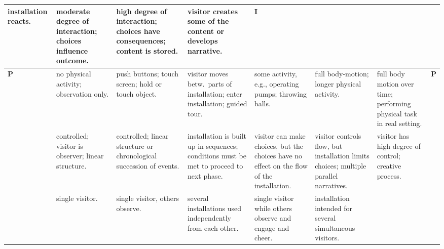 \begin{sidewaystable}
\begin{tabular}{|l|p{.13\hsize}|p{.13\hsize}|p{.13\hsize}|p{.13\hsize}|p{.13\hsize}|p{.13\hsize}|l|}
installation reacts. &
moderate degree of interaction; choices influence outcome. &
high degree of interaction; choices have consequences;
content is stored. &
visitor creates some of the content or develops narrative.  &
\multirow{4}{*}{\bf I} \\
\hline
\multirow{4}{*}{\bf P}&
no physical activity; observation only. &
push buttons; touch screen; hold or touch object. &
visitor moves betw.\ parts of installation; enter installation; guided tour. &
some activity, e.g., operating pumps; throwing balls. &
full body-motion; longer physical activity. &
full body motion over time; performing physical task in real setting. &
\multirow{4}{*}{\bf P} \\
\hline
\multirow{4}{*}{\bf U}&
controlled; visitor is observer; linear structure. &
controlled;
linear structure or chronological succession of events. &
installation is built up in sequences; conditions must be met to proceed to next phase. &
visitor can make choices, but the choices have no effect on the flow of the installation. &
visitor controls flow, but installation limits choices; multiple parallel narratives. &
visitor has high degree of control; creative process. & %
\multirow{4}{*}{\bf U} \\
\hline
\multirow{4}{*}{\bf S}&
single visitor. &
single visitor, others observe. &
several installations used independently from each other. &
single visitor while others observe and engage and cheer. &
installation intended for several simultaneous visitors. &

\end{tabular}
\end{sidewaystable}
